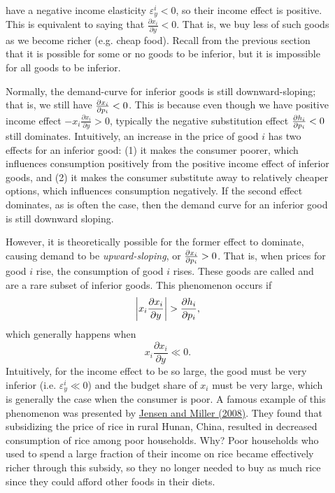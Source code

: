 \begin{description}
\item[] have a negative income elasticity $\varepsilon_y^i < 0$, so their income effect is positive. This is equivalent to saying that $\frac{\partial x_i}{\partial y} < 0$. That is, we buy less of such goods as we become richer (e.g. cheap food). Recall from the previous section that it is possible for some or no goods to be inferior, but it is impossible for all goods to be inferior. 

Normally, the demand-curve for inferior goods is still downward-sloping; that is, we still have $\pdv{x_i}{p_i} < 0$. This is because even though we have positive income effect $-x_{i} \frac{\partial x_{i}}{\partial y}>0$, typically the negative substitution effect $\pdv{h_i}{p_i} < 0$ still dominates. Intuitively, an increase in the price of good $i$ has two effects for an inferior good: (1) it makes the consumer poorer, which influences consumption positively from the positive income effect of inferior goods, and (2) it makes the consumer substitute away to relatively cheaper options, which influences consumption negatively. If the second effect dominates, as is often the case, then the demand curve for an inferior good is still downward sloping.

However, it is theoretically possible for the former effect to dominate, causing demand to be \textit{upward-sloping}, or $\pdv{x_i}{p_i} > 0$. That is, when prices for good $i$ rise, the consumption of good $i$ rises. These goods are called  and are a rare subset of inferior goods. This phenomenon occurs if 
$$
\bigg | x_{i} \frac{\partial x_{i}}{\partial y} \bigg | > \pdv{h_i}{p_i},
$$
which generally happens when 
$$x_{i} \frac{\partial x_{i}}{\partial y} \ll 0.$$
Intuitively, for the income effect to be so large, the good must be very inferior (i.e. $\varepsilon_y^i \ll 0$) and the budget share of $x_i$ must be very large, which is generally the case when the consumer is poor. A famous example of this phenomenon was presented by \href{https://www.ncbi.nlm.nih.gov/pmc/articles/PMC2964162/}{Jensen and Miller (2008)}. They found that subsidizing the price of rice in rural Hunan, China, resulted in decreased consumption of rice among poor households. Why? Poor households who used to spend a large fraction of their income on rice became effectively richer through this subsidy, so they no longer needed to buy as much rice since they could afford other foods in their diets.


\end{description}
